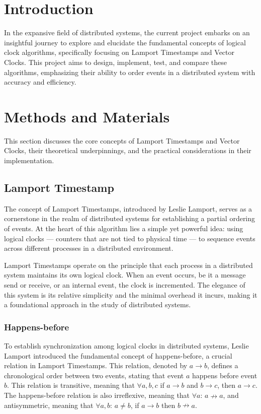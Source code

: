 \documentclass{article}
\begin{document}

\tableofcontents
\section{Introduction}
    In the expansive field of distributed systems, the current project embarks on an insightful journey to explore and elucidate the fundamental concepts of logical clock algorithms, specifically focusing on Lamport Timestamps and Vector Clocks. This project aims to design, implement, test, and compare these algorithms, emphasizing their ability to order events in a distributed system with accuracy and efficiency. 

   \section{Methods and Materials}
  This section discusses the core concepts of Lamport Timestamps and Vector Clocks, their theoretical underpinnings, and the practical considerations in their implementation.
\subsection{Lamport Timestamp}
  The concept of Lamport Timestamps, introduced by Leslie Lamport\cite{Lamport:1978}, serves as a cornerstone in the realm of distributed systems for establishing a partial ordering of events. At the heart of this algorithm lies a simple yet powerful idea: using logical clocks — counters that are not tied to physical time — to sequence events across different processes in a distributed environment.

  Lamport Timestamps operate on the principle that each process in a distributed system maintains its own logical clock. When an event occurs, be it a message send or receive, or an internal event, the clock is incremented. The elegance of this system is its relative simplicity and the minimal overhead it incurs, making it a foundational approach in the study of distributed systems.

  \subsubsection{Happens-before}
    To establish synchronization among logical clocks in distributed systems, Leslie Lamport introduced the fundamental concept of happens-before, a crucial relation in Lamport Timestamps. This relation, denoted by $a \rightarrow b$, defines a chronological order between two events, stating that event $a$ happens before event $b$. This relation is transitive, meaning that \(\forall a,b,c\) if $a \rightarrow b$ and $b \rightarrow c$, then $a \rightarrow c$. The happens-before relation is also irreflexive, meaning that \(\forall a\): $a \nrightarrow a$, and antisymmetric, meaning that \(\forall a,b\): $a \neq b$, if \(a \rightarrow b\) then $b \nrightarrow a$.
\end{document}
